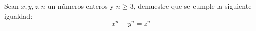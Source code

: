 \begin{problema}
    Sean $x, y, z, n$ un números enteros y $n \ge 3$, demuestre que se
    cumple la siguiente igualdad:
    $$ x^n + y^n = z^n $$
\end{problema}